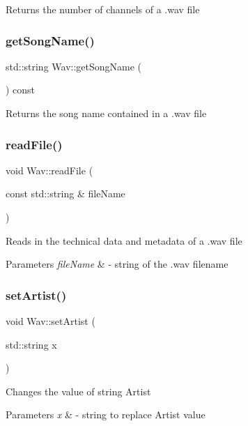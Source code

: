 Returns the number of channels of a .wav file \mbox{\label{classWav_a8de3a1bd3cc70540869a2a42ace98022}} 
\subsubsection{\texorpdfstring{get\+Song\+Name()}{getSongName()}}
{\footnotesize\ttfamily std\+::string Wav\+::get\+Song\+Name (\begin{DoxyParamCaption}{ }\end{DoxyParamCaption}) const}

Returns the song name contained in a .wav file \mbox{\label{classWav_a1c4230cec49d30147a5b8a1950083f7c}} 
\subsubsection{\texorpdfstring{read\+File()}{readFile()}}
{\footnotesize\ttfamily void Wav\+::read\+File (\begin{DoxyParamCaption}\item[{const std\+::string \&}]{file\+Name }\end{DoxyParamCaption})}

Reads in the technical data and metadata of a .wav file 
\begin{DoxyParams}{Parameters}
{\em file\+Name} & -\/ string of the .wav filename \\
\hline
\end{DoxyParams}
\mbox{\label{classWav_acf8f0bbb6e0791d1f0c083c6700e0607}} 
\subsubsection{\texorpdfstring{set\+Artist()}{setArtist()}}
{\footnotesize\ttfamily void Wav\+::set\+Artist (\begin{DoxyParamCaption}\item[{std\+::string}]{x }\end{DoxyParamCaption})}

Changes the value of string Artist 
\begin{DoxyParams}{Parameters}
{\em x} & -\/ string to replace Artist value \\
\hline
\end{DoxyParams}
\mbox{\label{classWav_aa05dac85e219a94afc6a6f38530306ce}} 
